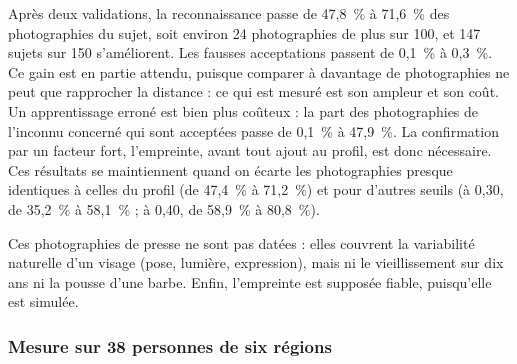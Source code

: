\begin{maj}
Après deux validations, la reconnaissance passe de 47,8~\% à 71,6~\% des photographies du sujet, soit environ 24 photographies de plus sur 100, et 147 sujets sur 150 s'améliorent. Les fausses acceptations passent de 0,1~\% à 0,3~\%. Ce gain est en partie attendu, puisque comparer à davantage de photographies ne peut que rapprocher la distance : ce qui est mesuré est son ampleur et son coût. Un apprentissage erroné est bien plus coûteux : la part des photographies de l'inconnu concerné qui sont acceptées passe de 0,1~\% à 47,9~\%. La confirmation par un facteur fort, l'empreinte, avant tout ajout au profil, est donc nécessaire. Ces résultats se maintiennent quand on écarte les photographies presque identiques à celles du profil (de 47,4~\% à 71,2~\%) et pour d'autres seuils (à 0,30, de 35,2~\% à 58,1~\% ; à 0,40, de 58,9~\% à 80,8~\%).

Ces photographies de presse ne sont pas datées : elles couvrent la variabilité naturelle d'un visage (pose, lumière, expression), mais ni le vieillissement sur dix ans ni la pousse d'une barbe. Enfin, l'empreinte est supposée fiable, puisqu'elle est simulée.
\end{maj}

\subsubsection{Mesure sur 38 personnes de six régions}\label{sec:trentehuit}

